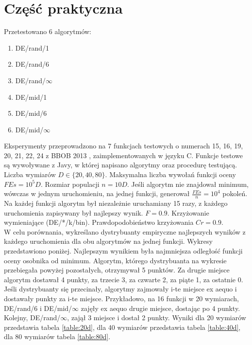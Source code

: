 \documentclass[12pt, a4paper]{article}
\begin{document}
\section{Część praktyczna}

Przetestowano 6 algorytmów:
\begin{enumerate}
 \item DE/rand/1
 \item DE/rand/6
 \item DE/rand/$\infty$ 
 \item DE/mid/1 
 \item DE/mid/6 
 \item DE/mid/$\infty$ 
\end{enumerate}

Eksperymenty przeprowadzono na 7 funkcjach testowych o numerach 15, 16, 19, 20, 21, 22, 24 z BBOB 2013 \cite{finck}, zaimplementowanych w języku C.
Funkcje testowe są wywoływane z Javy, w której napisano algorytmy oraz procedurę testującą.
Liczba wymiarów $D \in \{20, 40, 80\}$. Maksymalna liczba wywołań funkcji oceny $FEs = 10^5D$. Rozmiar populacji $n = 10D$. 
Jeśli algorytm nie znajdował minimum, wówczas w jednym uruchomieniu, na jednej funkcji, generował $\frac{FEs}{n} = 10^4$ pokoleń.
Na każdej funkcji algorytm był niezależnie uruchamiany 15 razy, z każdego uruchomienia zapisywany był najlepszy wynik.
$F = 0.9$. Krzyżowanie wymieniające (DE/*/k/bin).
Prawdopodobieństwo krzyżowania $Cr = 0.9$. \\

W celu porównania, wykreślano dystrybuanty empiryczne najlepszych wyników z każdego uruchomienia 
dla obu algorytmów na jednej funkcji. Wykresy przedstawiono poniżej.
Najlepszym wynikiem była najmniejsza odległość funkcji oceny osobnika od minimum.
Algorytm, którego dystrybuanta na wykresie przebiegała powyżej pozostałych, otrzymywał 5 punktów. 
Za drugie miejsce algorytm dostawał 4 punkty, za trzecie 3, za czwarte 2, za piąte 1, za ostatnie 0. 
Jeśli dystrybuanty się przecinały, algorytmy zajmowały i-te miejsce ex aequo i dostawały punkty za i-te miejsce.
Przykładowo, na 16 funkcji w 20 wymiarach, DE/rand/6 i DE/mid/$\infty$ zajęły ex aequo drugie miejsce, dostając po 4 punkty.
Kolejny, DE/rand/$\infty$, zajął 3 miejsce i dostał 2 punkty.
Wyniki dla 20 wymiarów przedstawia tabela \ref{table:20d}, dla 40 wymiarów przedstawia tabela \ref{table:40d},
dla 80 wymiarów tabela \ref{table:80d}. \\ 
\end{document}
